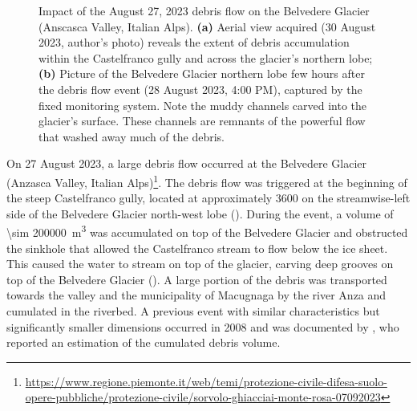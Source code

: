\begin{figure}[ht!]
    \centering
    \caption{Impact of the August 27, 2023 debris flow on the Belvedere Glacier (Anscasca Valley, Italian Alps). \textbf{(a)} Aerial view acquired (30 August 2023, author's photo) reveals the extent of debris accumulation within the Castelfranco gully and across the glacier's northern lobe; \textbf{(b)} Picture of the Belvedere Glacier northern lobe few hours after the debris flow event (28 August 2023, 4:00 PM), captured by the fixed monitoring system. Note the 
    muddy channels carved into the glacier's surface. These channels are remnants of the powerful flow that washed away much of the debris.
    }
    \label{fig:1:belvedere_debris_flow}
\end{figure}

On 27 August 2023, a large debris flow occurred at the Belvedere Glacier (Anzasca Valley, Italian Alps)\footnote{\url{https://www.regione.piemonte.it/web/temi/protezione-civile-difesa-suolo-opere-pubbliche/protezione-civile/sorvolo-ghiacciai-monte-rosa-07092023}}.
The debris flow was triggered at the beginning of the steep Castelfranco gully, located at approximately \SI{3600}{\masl} on the streamwise-left side of the Belvedere Glacier north-west lobe ().
During the event, a volume of \SI{\sim 200000}{\cubic\meter} was accumulated on top of the Belvedere Glacier and obstructed the sinkhole that allowed the Castelfranco stream to flow below the ice sheet. 
This caused the water to stream on top of the glacier, carving deep grooves on top of the Belvedere Glacier (). 
A large portion of the debris was transported towards the valley and the municipality of Macugnaga by the river Anza and cumulated in the riverbed.
A previous event with similar characteristics but significantly smaller dimensions occurred in 2008 and was documented by \citet{Mortara2009}, who reported an estimation of the cumulated debris volume.

